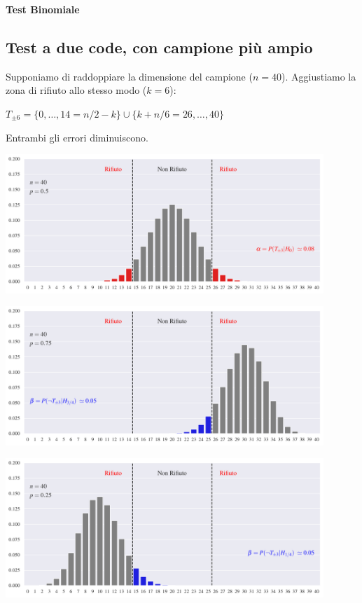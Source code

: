 \documentclass[11pt,openany]{book}
\begin{document}
\clearpage\hfill\textbf{Test Binomiale}
\subsection{Test a due code, con campione più ampio}

Supponiamo di raddoppiare la dimensione del campione ($n=40$). Aggiustiamo la zona di rifiuto allo stesso modo ($k=6$): 

\hfil$T_{\pm6}=\{0,\dots,14=n/2-k\}\cup \{k+n/6=26,\dots,40\}$

Entrambi gli errori diminuiscono.


\hfil\includegraphics[width=0.9\textwidth]{figure/B-test_07.pdf}

\hfil\includegraphics[width=0.9\textwidth]{figure/B-test_08.pdf}

\hfil\includegraphics[width=0.9\textwidth]{figure/B-test_09.pdf}
\end{document}
